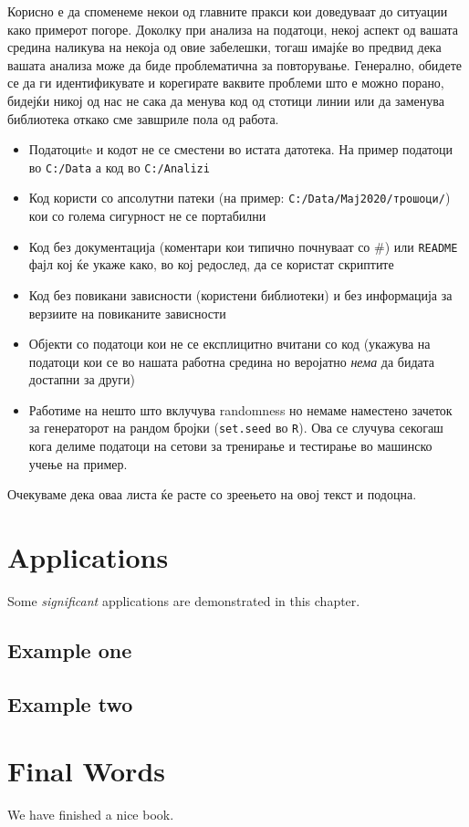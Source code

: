\documentclass[
]{book}
\begin{document}
Корисно е да споменеме некои од главните пракси кои доведуваат до ситуации како примерот погоре. Доколку при анализа на податоци, некој аспект од вашата средина наликува на некоја од овие забелешки, тогаш имајќе во предвид дека вашата анализа може да биде проблематична за повторување. Генерално, обидете се да ги идентификувате и корегирате ваквите проблеми што е можно порано, бидејќи никој од нас не сака да менува код од стотици линии или да заменува библиотека откако сме завшриле пола од работа.

\begin{itemize}
\item
  Податоциte и кодот не се сместени во истата датотека. На пример податоци во \texttt{C:/Data} а код во \texttt{C:/Analizi}
\item
  Код користи со апсолутни патеки (на пример: \texttt{C:/Data/Мај2020/трошоци/}) кои со голема сигурност не се портабилни
\item
  Код без документација (коментари кои типично почнуваат со \#) или \texttt{README} фајл кој ќе укаже како, во кој редослед, да се користат скриптите
\item
  Код без повикани зависности (користени библиотеки) и без информација за верзиите на повиканите зависности
\item
  Објекти со податоци кои не се експлицитно вчитани со код (укажува на податоци кои се во нашата работна средина но веројатно \emph{нема} да бидата достапни за други)
\item
  Работиме на нешто што вклучува randomness но немаме наместено зачеток за генераторот на рандом бројки (\texttt{set.seed} во \texttt{R}). Ова се случува секогаш кога делиме податоци на сетови за тренирање и тестирање во машинско учење на пример.
\end{itemize}

Очекуваме дека оваа листа ќе расте со зреењето на овој текст и подоцна.

\hypertarget{applications}{%
\chapter{Applications}\label{applications}}

Some \emph{significant} applications are demonstrated in this chapter.

\hypertarget{example-one}{%
\section{Example one}\label{example-one}}

\hypertarget{example-two}{%
\section{Example two}\label{example-two}}

\hypertarget{final-words}{%
\chapter{Final Words}\label{final-words}}

We have finished a nice book.

  
\end{document}
